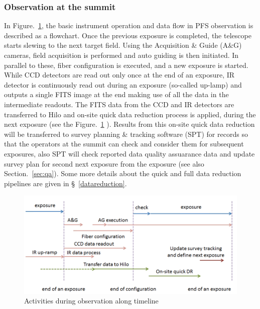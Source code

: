 \documentclass[a4paper,notitlepage]{article}
\begin{document}
\subsubsection{Observation at the summit}

In Figure.~\ref{fig:sciops-scireq-slide-oneexp}, the basic instrument
operation and data flow in PFS observation is described as a
flowchart. Once the previous exposure is completed, the telescope starts
slewing to the next target field. Using the Acquisition \& Guide (A\&G)
cameras, field acquisition is performed and auto guiding is then
initiated. In parallel to these, fiber configuration is executed, and a
new exposure is started. While CCD detectors are read out only once at
the end of an exposure, IR detector is continuously read out during an
exposure (so-called up-lamp) and outputs a single FITS image at the end
making use of all the data in the intermediate readouts. The FITS data
from the CCD and IR detectors are transferred to Hilo and on-site quick
data reduction process is applied, during the next exposure (see the
Figure.~\ref{fig:sciops-scireq-slide-oneexp}
). Results from this on-site quick data reduction will be transferred to
survey planning \& tracking software (SPT) for records so that the operators
at the summit can check and consider them for subsequent exposures, 
also SPT will check reported data quality assuarance data and update survey 
plan for second next exposure from the exposure 
(see also Section.~\ref{sec:qa}). 
Some
more details about the quick and full data reduction pipelines are given
in \S~\ref{datareduction}.

\begin{figure}[htb]
  \begin{center}
    \includegraphics[width=.75\linewidth]{sciops-scireq-slide-oneexp.png}
  \end{center}
  \caption{Activities during observation along timeline}
  \label{fig:sciops-scireq-slide-oneexp}
\end{figure}
\end{document}
